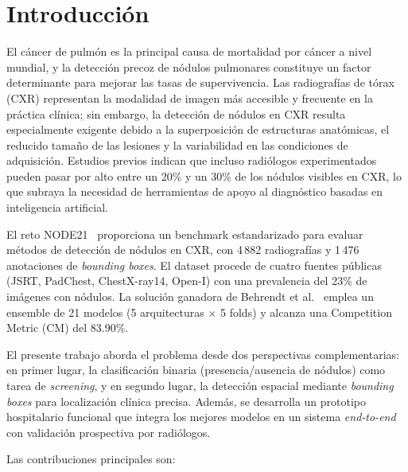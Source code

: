 \documentclass[conference]{IEEEtran}
\begin{document}

\section{Introducci\'{o}n}

El c\'{a}ncer de pulm\'{o}n es la principal causa de mortalidad por c\'{a}ncer
a nivel mundial, y la detecci\'{o}n precoz de n\'{o}dulos pulmonares
constituye un factor determinante para mejorar las tasas de supervivencia. Las
radiograf\'{i}as de t\'{o}rax (CXR) representan la modalidad de imagen m\'{a}s
accesible y frecuente en la pr\'{a}ctica cl\'{i}nica; sin embargo, la
detecci\'{o}n de n\'{o}dulos en CXR resulta especialmente exigente debido a la
superposici\'{o}n de estructuras anat\'{o}micas, el reducido tama\~{n}o de las
lesiones y la variabilidad en las condiciones de adquisici\'{o}n. Estudios
previos indican que incluso radi\'{o}logos experimentados pueden pasar por alto
entre un 20\% y un 30\% de los n\'{o}dulos visibles en CXR, lo que subraya la
necesidad de herramientas de apoyo al diagn\'{o}stico basadas en inteligencia
artificial.

El reto NODE21~\cite{behrendt2023node21,node21challenge} proporciona un
benchmark estandarizado para evaluar m\'{e}todos de detecci\'{o}n de
n\'{o}dulos en CXR, con 4\,882 radiograf\'{i}as y 1\,476 anotaciones de
\textit{bounding boxes}. El dataset procede de cuatro fuentes p\'{u}blicas
(JSRT, PadChest, ChestX-ray14, Open-I) con una prevalencia del 23\% de
im\'{a}genes con n\'{o}dulos. La soluci\'{o}n ganadora de Behrendt et
al.~\cite{behrendt2023node21} emplea un ensemble de 21 modelos (5
arquitecturas $\times$ 5 folds) y alcanza una Competition Metric (CM) del
83.90\%.

El presente trabajo aborda el problema desde dos perspectivas complementarias:
en primer lugar, la clasificaci\'{o}n binaria (presencia/ausencia de
n\'{o}dulos) como tarea de \textit{screening}, y en segundo lugar, la
detecci\'{o}n espacial mediante \textit{bounding boxes} para localizaci\'{o}n
cl\'{i}nica precisa. Adem\'{a}s, se desarrolla un prototipo hospitalario
funcional que integra los mejores modelos en un sistema \textit{end-to-end} con
validaci\'{o}n prospectiva por radi\'{o}logos.

Las contribuciones principales son:
\end{document}
